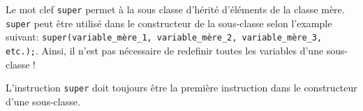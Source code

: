 \begin{Exercice}[10 minutes]
\begin{conseil}
Le mot clef \lstinline{super} permet à la sous classe d'hérité d'éléments de la classe mère. \lstinline{super} peut être utilisé dans le constructeur de la sous-classe selon l'example suivant: \lstinline{super(variable_mère_1, variable_mère_2, variable_mère_3, etc.);}. Ainsi, il n'est pas nécessaire de redefinir toutes les variables d'une sous-classe !

L'instruction \lstinline{super} doit toujours être la première instruction dans le constructeur d'une sous-classe. 
\end{conseil}

\begin{solution}
	
\end{solution}

\end{Exercice}

